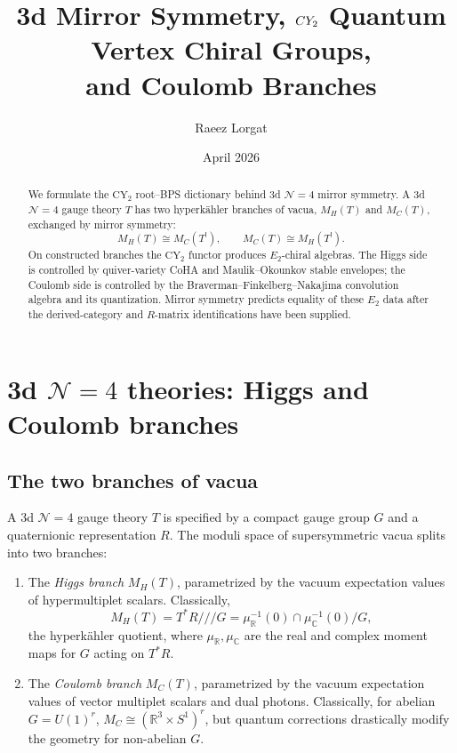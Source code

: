 \documentclass[11pt]{article}
\title{3d Mirror Symmetry, $\CY_2$ Quantum Vertex Chiral Groups,\\
and Coulomb Branches}
\author{Raeez Lorgat}
\date{April 2026}
\theoremstyle{definition}
\theoremstyle{remark}
\newcommand{\CY}{\mathrm{CY}}
\newcommand{\Etwo}{E_2}
\newcommand{\cN}{\mathcal{N}}
\begin{document}
\maketitle

\begin{abstract}
We formulate the $\CY_2$ root--BPS dictionary behind 3d $\cN=4$ mirror symmetry. A 3d $\cN=4$ gauge theory $T$ has two hyperk\"ahler branches of vacua, $M_H(T)$ and $M_C(T)$, exchanged by mirror symmetry:
\[
 M_H(T) \cong M_C(T^!), \qquad M_C(T) \cong M_H(T^!).
\]
On constructed branches the $\CY_2$ functor produces $\Etwo$-chiral algebras. The Higgs side is controlled by quiver-variety CoHA and Maulik--Okounkov stable envelopes; the Coulomb side is controlled by the Braverman--Finkelberg--Nakajima convolution algebra and its quantization. Mirror symmetry predicts equality of these $\Etwo$ data after the derived-category and $R$-matrix identifications have been supplied.
\end{abstract}

\tableofcontents

\section{3d $\cN=4$ theories: Higgs and Coulomb branches}
\label{sec:3d-n4}

\subsection{The two branches of vacua}

A 3d $\cN=4$ gauge theory $T$ is specified by a compact gauge group $G$ and a quaternionic representation $R$. The moduli space of supersymmetric vacua splits into two branches:

\begin{enumerate}[label=(\roman*)]
 \item The \emph{Higgs branch} $M_H(T)$, parametrized by the vacuum expectation values of hypermultiplet scalars. Classically,
 \[
 M_H(T) = T^*R \mathbin{/\!\!/\!\!/} G = \mu_{\mathbb{R}}^{-1}(0) \cap \mu_{\mathbb{C}}^{-1}(0) / G,
 \]
 the hyperk\"ahler quotient, where $\mu_{\mathbb{R}}, \mu_{\mathbb{C}}$ are the real and complex moment maps for $G$ acting on $T^*R$.

 \item The \emph{Coulomb branch} $M_C(T)$, parametrized by the vacuum expectation values of vector multiplet scalars and dual photons. Classically, for abelian $G = U(1)^r$, $M_C \cong (\mathbb{R}^3 \times S^1)^r$, but quantum corrections drastically modify the geometry for non-abelian $G$.
\end{enumerate}
\end{document}
